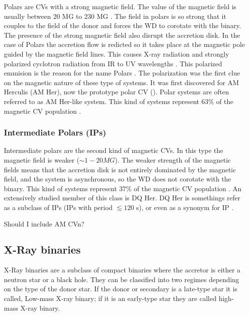 Polars are CVs with a strong magnetic field. The value of the magnetic field is usually between 20 MG to 230  MG \citep{balman_x-ray_2012}. The field in polars is so strong that it couples to the field of the donor and forces the WD to corotate with the binary. The presence of the strong magnetic field also disrupt the accretion disk. In the case of Polars the accretion flow is redicted so it takes place at the magnetic pole guided by the magnetic field lines. This causes X-ray radiation and strongly polarized cyclotron radiation from IR to UV wavelengths \citep{cropper_polars_1990}. This polarized emmision is the reason for the name Polars \citep{krzeminski_extremely_1977}. The polarization was the first clue on the magnetic nature of these type of systems. It was first discovered for AM Herculis (AM Her), now the prototype polar CV (\cite{tapia_discovery_1977}). Polar systems are often referred to as AM Her-like system. This kind of systems represent $63 \%$ of the magnetic CV population \citep{balman_x-ray_2012}.

\subsubsection{Intermediate Polars (IPs)}

Intermediate polars are the second kind of magnetic CVs. In this type the magnetic field is weaker ($\sim 1-20 MG$). The weaker strength of the magnetic fields means that the accretion disk is not entirely dominated by the magnetic field, and the system is asynchronous, so the WD does not corotate with the binary. This kind of systems represent $37 \%$ of the magnetic CV population \citep{balman_x-ray_2012}. An extensively studied member of this class is DQ Her. DQ Her is somethings refer as a subclass of IPs (IPs with period $\lesssim 120 $ s), or even as a synonym for IP \citep{patterson_dq_1994,warner_cataclysmic_2003}.  


Should I include AM CVn? %

\subsection{X-Ray binaries}

X-Ray binaries are a subclass of compact binaries where the accretor is either a neutron star or a black hole. They can be classified into two regimes depending on the type of the donor star. If the donor or secondary is a late-type star it is called, Low-mass X-ray binary; if it is an early-type star they are called high-mass X-ray binary.


